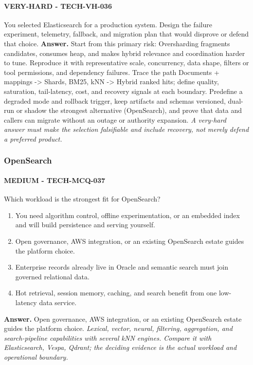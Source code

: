 \paragraph{VERY-HARD - TECH-VH-036} You selected Elasticsearch for a production system. Design the failure experiment, telemetry, fallback, and migration plan that would disprove or defend that choice.
\textbf{Answer.} Start from this primary risk: Oversharding fragments candidates, consumes heap, and makes hybrid relevance and coordination harder to tune. Reproduce it with representative scale, concurrency, data shape, filters or tool permissions, and dependency failures. Trace the path Documents + mappings -> Shards, BM25, kNN -> Hybrid ranked hits; define quality, saturation, tail-latency, cost, and recovery signals at each boundary. Predefine a degraded mode and rollback trigger, keep artifacts and schemas versioned, dual-run or shadow the strongest alternative (OpenSearch), and prove that data and callers can migrate without an outage or authority expansion.
\textit{A very-hard answer must make the selection falsifiable and include recovery, not merely defend a preferred product.}
\subsubsection*{OpenSearch}
\paragraph{MEDIUM - TECH-MCQ-037} Which workload is the strongest fit for OpenSearch?
\begin{enumerate}[label=\Alph*.]
\item You need algorithm control, offline experimentation, or an embedded index and will build persistence and serving yourself.
\item Open governance, AWS integration, or an existing OpenSearch estate guides the platform choice.
\item Enterprise records already live in Oracle and semantic search must join governed relational data.
\item Hot retrieval, session memory, caching, and search benefit from one low-latency data service.
\end{enumerate}
\textbf{Answer.} Open governance, AWS integration, or an existing OpenSearch estate guides the platform choice.
\textit{Lexical, vector, neural, filtering, aggregation, and search-pipeline capabilities with several kNN engines. Compare it with Elasticsearch, Vespa, Qdrant; the deciding evidence is the actual workload and operational boundary.}
